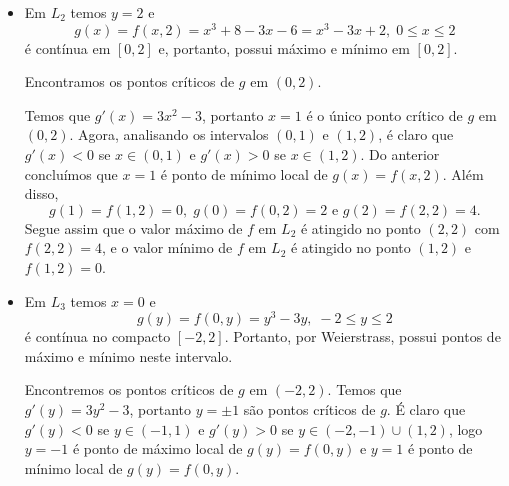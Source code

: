 \begin{example}
\begin{itemize}
            \begin{remark}
                Observe que existem outras maneiras de realizar o estudo feito para \(L_1\). Por exemplo
                    \begin{enumerate}
                        \item Podemos usar o Teste da 2ª Derivada. Note que \(g''(y) = 6y\), assim, sendo \(g''(-1) = -6 <0\), concluímos que \(y=-1\) é ponto de máximo local de \(g\), e \(g''(1) = 6 >0\) garante que \(y=1\) é ponto de mínimo local.
                        \item Utilizando o Teorema de Weierstrass para funções de uma variável real temos que, como \(g(y) = f(y,2)\) é diferenciável em \((-2,2)\), basta compararmos \(g(-1) = f(2,-1) = 4\), \(g(1) = f(2,1) = 0\), \(g(-2) = f(2,-2) = 0\) e \(g(2) = f(2,2) = 4\).
                    \end{enumerate}
            \end{remark}
            \item Em \(L_2\) temos \(y = 2\) e \[g(x) = f(x,2) = x^3 + 8 -3x - 6 = x^3 - 3x + 2,\; 0\leq x\leq 2\] é contínua em \([0,2]\) e, portanto, possui máximo e mínimo em \([0,2]\). 
            
            Encontramos os pontos críticos de \(g\) em \((0,2)\).

            Temos que \(g'(x) = 3x^2 - 3\), portanto \(x = 1\) é o único ponto crítico de \(g\) em \((0,2)\). Agora, analisando os intervalos \((0,1)\) e \((1,2)\), é claro que \(g'(x) < 0\) se \(x\in(0,1)\) e \(g'(x) > 0\) se \(x\in(1,2)\). Do anterior concluímos que \(x=1\) é ponto de mínimo local de \(g(x) = f(x,2)\). Além disso, \[g(1) = f(1,2) = 0,\; g(0) = f(0,2) = 2 \text{ e } g(2) = f(2,2) = 4.\] Segue assim que o valor máximo de \(f\) em \(L_2\) é atingido no ponto \((2,2)\) com \(f(2,2) = 4\), e o valor mínimo de \(f\) em \(L_2\) é atingido no ponto \((1,2)\) e \(f(1,2) = 0\).
            \item Em \(L_3\) temos \(x=0\) e \[g(y) = f(0,y) = y^3 - 3y,\; -2\leq y \leq 2\] é contínua no compacto \([-2,2]\). Portanto, por Weierstrass, possui pontos de máximo e mínimo neste intervalo.
            
            Encontremos os pontos críticos de \(g\) em \((-2,2)\). Temos que \(g'(y) = 3y^2 - 3\), portanto \(y = \pm 1\) são pontos críticos de \(g\). É claro que \(g'(y) < 0\) se \(y\in(-1,1)\) e \(g'(y) > 0\) se \(y\in(-2,-1)\cup(1,2)\), logo \(y=-1\) é ponto de máximo local de \(g(y) = f(0,y)\) e \(y=1\) é ponto de mínimo local de \(g(y) = f(0,y)\).


\end{itemize}
\end{example}
